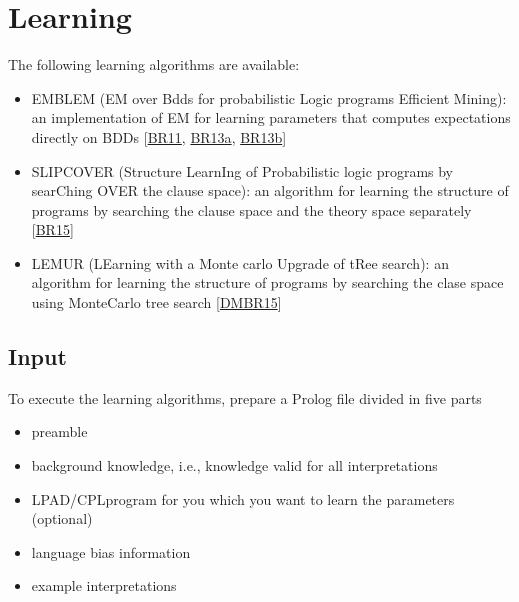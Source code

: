 \documentclass[letterpaper,10pt,english]{sphinxmanual}
\begin{document}
\chapter{Learning}
\label{\detokenize{index:learning}}
\sphinxAtStartPar
The following learning algorithms are available:
\begin{itemize}
\item {} 
\sphinxAtStartPar
EMBLEM (EM over Bdds for probabilistic Logic programs Efficient Mining): an implementation of EM for learning parameters that computes expectations directly on BDDs {[}\hyperlink{cite.index:id59}{BR11}, \hyperlink{cite.index:id64}{BR13a}, \hyperlink{cite.index:id58}{BR13b}{]}

\item {} 
\sphinxAtStartPar
SLIPCOVER (Structure LearnIng of Probabilistic logic programs by searChing OVER the clause space): an algorithm for learning the structure of programs by searching the clause space and the theory space separately {[}\hyperlink{cite.index:id60}{BR15}{]}

\item {} 
\sphinxAtStartPar
LEMUR (LEarning with a Monte carlo Upgrade of tRee search): an algorithm for learning the structure of programs by searching the clase space using Monte\sphinxhyphen{}Carlo tree search {[}\hyperlink{cite.index:id61}{DMBR15}{]}

\end{itemize}


\section{Input}
\label{\detokenize{index:input}}
\sphinxAtStartPar
To execute the learning algorithms, prepare a Prolog file divided in five parts
\begin{itemize}
\item {} 
\sphinxAtStartPar
preamble

\item {} 
\sphinxAtStartPar
background knowledge, i.e., knowledge valid for all interpretations

\item {} 
\sphinxAtStartPar
LPAD/CPL\sphinxhyphen{}program for you which you want to learn the parameters (optional)

\item {} 
\sphinxAtStartPar
language bias information

\item {} 
\sphinxAtStartPar
example interpretations

\end{itemize}
\end{document}
